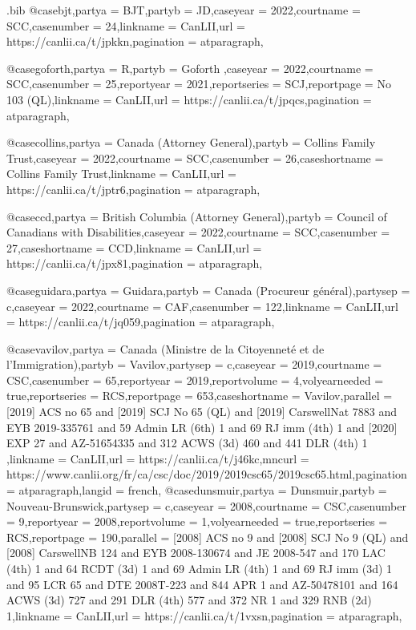
\begin{filecontents*}[overwrite]{\jobname.bib}
@case{bjt,partya = {BJT},partyb = {JD\@},caseyear = {2022},courtname = {SCC},casenumber = {24},linkname = {CanLII},url = {https://canlii.ca/t/jpkkn},pagination = {atparagraph},}

@case{goforth,partya = {R},partyb = {Goforth },caseyear = {2022},courtname = {SCC},casenumber = {25},reportyear = {2021},reportseries = {SCJ},reportpage = {No 103 (QL)},linkname = {CanLII},url = {https://canlii.ca/t/jpqcs},pagination = {atparagraph},}

@case{collins,partya = {Canada (Attorney General)},partyb = {Collins Family Trust},caseyear = {2022},courtname = {SCC},casenumber = {26},caseshortname = {Collins Family Trust},linkname = {CanLII},url = {https://canlii.ca/t/jptr6},pagination = {atparagraph},}

@case{ccd,partya = {British Columbia (Attorney General)},partyb = {Council of Canadians with Disabilities},caseyear = {2022},courtname = {SCC},casenumber = {27},caseshortname = {CCD},linkname = {CanLII},url = {https://canlii.ca/t/jpx81},pagination = {atparagraph},}

@case{guidara,partya = {Guidara},partyb = {Canada (Procureur général)},partysep = {c},caseyear = {2022},courtname = {CAF},casenumber = {122},linkname = {CanLII},url = {https://canlii.ca/t/jq059},pagination = {atparagraph},}

@case{vavilov,partya = {Canada (Ministre de la Citoyenneté et de l’Immigration)},partyb = {Vavilov},partysep = {c},caseyear = {2019},courtname = {CSC},casenumber = {65},reportyear = {2019},reportvolume = {4},volyearneeded = {true},reportseries = {RCS},reportpage = {653},caseshortname = {Vavilov},parallel = { [2019] ACS no 65 and [2019] SCJ No 65 (QL) and [2019] CarswellNat 7883 and EYB 2019-335761 and 59 Admin LR (6th) 1 and 69 RJ imm (4th) 1 and [2020] EXP 27 and AZ-51654335 and 312 ACWS (3d) 460 and 441 DLR (4th) 1 },linkname = {CanLII},url = {https://canlii.ca/t/j46kc},mncurl = {https://www.canlii.org/fr/ca/csc/doc/2019/2019csc65/2019csc65.html},pagination = {atparagraph},langid = {french},}
@case{dunsmuir,partya = {Dunsmuir},partyb = {Nouveau-Brunswick},partysep = {c},caseyear = {2008},courtname = {CSC},casenumber = {9},reportyear = {2008},reportvolume = {1},volyearneeded = {true},reportseries = {RCS},reportpage = {190},parallel = { [2008] ACS no 9 and [2008] SCJ No 9 (QL) and [2008] CarswellNB 124 and EYB 2008-130674 and JE 2008-547 and 170 LAC (4th) 1 and 64 RCDT (3d) 1 and 69 Admin LR (4th) 1 and 69 RJ imm (3d) 1 and 95 LCR 65 and DTE 2008T-223 and 844 APR 1 and AZ-50478101 and 164 ACWS (3d) 727 and 291 DLR (4th) 577 and 372 NR 1 and 329 RNB (2d) 1},linkname = {CanLII},url = {https://canlii.ca/t/1vxsn},pagination = {atparagraph},}


\end{filecontents*}

